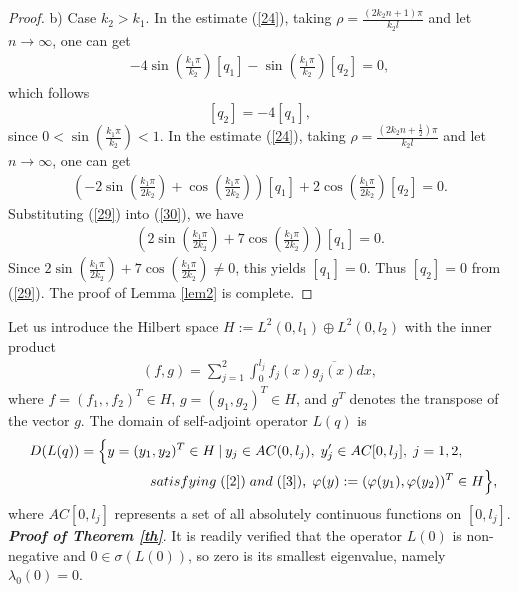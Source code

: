 \documentclass[reqno,11pt,centertags]{amsart}
\numberwithin{equation}{section}
\theoremstyle{definition}
\begin{document}
\begin{proof}
b) Case $k_{2}>k_{1}$.
In the estimate (\ref{24}), taking $\rho=\frac{(2k_{2}n+1)\pi}{k_{2}l}$ and let $n\rightarrow\infty$, one can get
\begin{align}\label{28}
 -4\sin\left(\frac{k_{1}\pi}{k_{2}}\right)[q_{1}]-\sin\left(\frac{k_{1}\pi}{k_{2}}\right)[q_{2}]=0,
\end{align}
which follows
\begin{equation}\label{29}
  [q_{2}]=-4[q_{1}],
\end{equation}
since $0<\sin\left(\frac{k_{1}\pi}{k_{2}}\right)<1$. In the estimate (\ref{24}), taking $\rho=\frac{(2k_{2}n+\frac{1}{2})\pi}{k_{2}l}$ and let $n\rightarrow\infty$, one can get
\begin{align}\label{30}
 \left(-2\sin\left(\frac{k_{1}\pi}{2k_{2}}\right)+\cos\left(\frac{k_{1}\pi}{2k_{2}}\right)\right)[q_{1}]+2\cos\left(\frac{k_{1}\pi}{2k_{2}}\right)[q_{2}]=0.
\end{align}
Substituting (\ref{29}) into (\ref{30}), we have
\begin{align}
 \left(2\sin\left(\frac{k_{1}\pi}{2k_{2}}\right)+7\cos\left(\frac{k_{1}\pi}{2k_{2}}\right)\right)[q_{1}]=0. \nonumber
\end{align}
Since $2\sin\left(\frac{k_{1}\pi}{2k_{2}}\right)+7\cos\left(\frac{k_{1}\pi}{2k_{2}}\right)\neq0$, this yields $[q_{1}]=0$.
Thus $[q_{2}]=0$ from (\ref{29}).
The proof of Lemma \ref{lem2} is complete.
\end{proof}


Let us introduce the Hilbert space $H:=L^{2}(0,l_{1})\oplus L^{2}(0,l_{2})$ with the inner product
\begin{align}
(f,g)=\sum_{j=1}^{2}\int_{0}^{l_{j}}f_{j}(x)\overline{g_{j}(x)}dx,\nonumber
\end{align}
where $f=(f_{1},,f_{2})^{T}\in H$, $g=(g_{1},g_{2})^{T}\in H$, and $g^{T}$ denotes the transpose of the vector $g$. The domain of self-adjoint operator $L(q)$ is
\begin{align}
D(L(q))=\Big\{y=(y_{1},y_{2})^{T}\in H\:|\:y_{j}\in AC(0,l_{j}),\;y'_{j}\in AC[0,l_{j}],\;j=1,2, \quad\quad\nonumber\\
\; satisfying \;(\ref{2})\; and\; (\ref{3}),\;\varphi(y):=(\varphi(y_{1}),\varphi(y_{2}))^{T}\in H\Big\}, \!\!\!\nonumber
\end{align}
where $AC[0,l_{j}]$ represents a set of all absolutely continuous functions on $[0,l_{j}]$.
\\

 \textbf{\textit{Proof of Theorem \ref{th}}}. It is readily verified that the operator $L(0)$ is non-negative and $0\in\sigma(L(0))$, so zero is its smallest eigenvalue, namely $\lambda_{0}(0)=0$.
\end{document}

